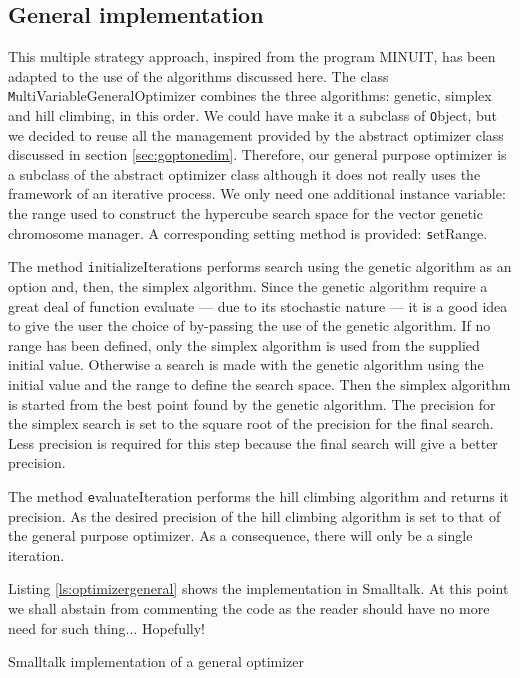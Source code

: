 \subsection{General implementation}
This multiple strategy approach, inspired from the program MINUIT,
has been adapted to the use of the algorithms discussed here. The
class {\texttt MultiVariableGeneralOptimizer} combines the three
algorithms: genetic, simplex and hill climbing, in this order. We
could have make it a subclass of {\texttt Object}, but we decided to
reuse all the management provided by the abstract optimizer class
discussed in section \ref{sec:goptonedim}. Therefore, our general
purpose optimizer is a subclass of the abstract optimizer class
although it does not really uses the framework of an iterative
process. We only need one additional instance variable: the range
used to construct the hypercube search space for the vector
genetic chromosome manager. A corresponding setting method is
provided: {\texttt setRange}.

The method {\texttt initializeIterations} performs search using the
genetic algorithm as an option and, then, the simplex algorithm.
Since the genetic algorithm require a great deal of function
evaluate --- due to its stochastic nature --- it is a good idea to
give the user the choice of by-passing the use of the genetic
algorithm. If no range has been defined, only the simplex
algorithm is used from the supplied initial value. Otherwise a
search is made with the genetic algorithm using the initial value
and the range to define the search space. Then the simplex
algorithm is started from the best point found by the genetic
algorithm. The precision for the simplex search is set to the
square root of the precision for the final search. Less precision
is required for this step because the final search will give a
better precision.

The method {\texttt evaluateIteration} performs the hill climbing
algorithm and returns it precision. As the desired precision of
the hill climbing algorithm is set to that of the general purpose
optimizer. As a consequence, there will only be a single
iteration.

Listing \ref{ls:optimizergeneral} shows the implementation in
Smalltalk. At this point we shall abstain from
commenting the code as the reader should have no more need for
such thing$\ldots$ Hopefully!

\begin{listing} Smalltalk
implementation of a general optimizer \label{ls:optimizergeneral}

\end{listing}

